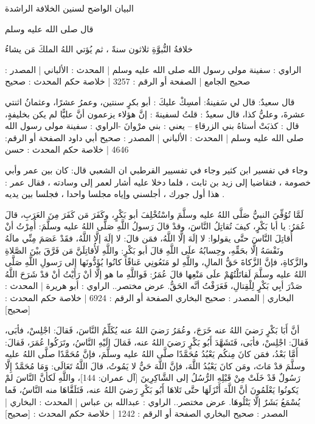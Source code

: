 البيان الواضح لسنين الخلافة الراشدة


قال صلى الله عليه وسلم 

خلافةُ النُّبوَّةِ ثلاثون سنةً ، ثم يُؤتي اللهُ الملكَ مَن يشاءُ

الراوي : سفينة مولى رسول الله صلى الله عليه وسلم | المحدث : الألباني | المصدر : صحيح الجامع | الصفحة أو الرقم : 3257 | خلاصة حكم المحدث : صحيح
   
قال سعيدٌ: قال لي سَفينةُ: أمسِكْ عليكَ : أبو بكرٍ سنتين، وعمرُ عشرًا، وعثمانُ اثنتي عشرةَ، وعليُّ كذا، قال سعيدٌ : قلتُ لسفينةَ : إنَّ هؤلاء يزعمون أنَّ عليًّا لم يكن بخليفةٍ، قال : كذبَتْ أستاهُ بني الزرقاءِ – يعني : بني مرْوانَ -الراوي : سفينة مولى رسول الله صلى الله عليه وسلم | المحدث : الألباني | المصدر : صحيح أبي داود
الصفحة أو الرقم: 4646 | خلاصة حكم المحدث : حسن

وجاء في تفسير ابن كثير 
وجاء في تفسيير القرطبي ان الشعبي قال: كان بين عمر وأبي خصومة ، فتقاضيا إلى زيد بن ثابت ، فلما دخلا عليه أشار لعمر إلى وسادته ، فقال عمر : هذا أول جورك ، أجلسني وإياه مجلسا واحدا ، فجلسا بين يديه .


لَمَّا تُوُفِّيَ النبيُّ صَلَّى اللهُ عليه وسلَّمَ واسْتُخْلِفَ أبو بَكْرٍ، وكَفَرَ مَن كَفَرَ مِنَ العَرَبِ، قالَ عُمَرُ: يا أبا بَكْرٍ، كيفَ تُقاتِلُ النَّاسَ، وقدْ قالَ رَسولُ اللَّهِ صَلَّى اللهُ عليه وسلَّمَ: أُمِرْتُ أنْ أُقاتِلَ النَّاسَ حتَّى يقولوا: لا إلَهَ إلَّا اللَّهُ، فمَن قالَ: لا إلَهَ إلَّا اللَّهُ، فقَدْ عَصَمَ مِنِّي مالَهُ ونَفْسَهُ إلَّا بحَقِّهِ، وحِسابُهُ علَى اللَّهِ قالَ أبو بَكْرٍ: واللَّهِ لَأُقاتِلَنَّ مَن فَرَّقَ بيْنَ الصَّلاةِ والزَّكاةِ، فإنَّ الزَّكاةَ حَقُّ المالِ، واللَّهِ لو مَنَعُونِي عَناقًا كانُوا يُؤَدُّونَها إلى رَسولِ اللَّهِ صَلَّى اللهُ عليه وسلَّمَ لَقاتَلْتُهُمْ علَى مَنْعِها قالَ عُمَرُ: فَواللَّهِ ما هو إلَّا أنْ رَأَيْتُ أنْ قدْ شَرَحَ اللَّهُ صَدْرَ أبِي بَكْرٍ لِلْقِتالِ، فَعَرَفْتُ أنَّه الحَقُّ.
عرض مختصر..
الراوي : أبو هريرة | المحدث : البخاري | المصدر : صحيح البخاري
الصفحة أو الرقم : 6924 | خلاصة حكم المحدث : [صحيح]

أنَّ أَبَا بَكْرٍ رَضيَ اللهُ عنه خَرَجَ، وعُمَرُ رَضيَ اللهُ عنه يُكَلِّمُ النَّاسَ، فَقالَ: اجْلِسْ، فأبَى، فَقالَ: اجْلِسْ، فأبَى، فَتَشَهَّدَ أَبُو بَكْرٍ رَضيَ اللهُ عنه، فَمَالَ إلَيْهِ النَّاسُ، وتَرَكُوا عُمَرَ، فَقالَ: أَمَّا بَعْدُ، فمَن كانَ مِنكُم يَعْبُدُ مُحَمَّدًا صلَّى اللهُ عليه وسلَّمَ، فإنَّ مُحَمَّدًا صلَّى اللهُ عليه وسلَّمَ قدْ مَاتَ، ومَن كانَ يَعْبُدُ اللَّهَ، فإنَّ اللَّهَ حَيٌّ لا يَمُوتُ، قالَ اللَّهُ تَعَالَى: {وَمَا مُحَمَّدٌ إِلَّا رَسُولٌ قَدْ خَلَتْ مِنْ قَبْلِهِ الرُّسُلُ} إلى {الشَّاكِرِينَ} [آل عمران: 144]، واللَّهِ لَكأنَّ النَّاسَ لمْ يَكونُوا يَعْلَمُونَ أنَّ اللَّهَ أَنْزَلَهَا حتَّى تَلاهَا أَبُو بَكْرٍ رَضيَ اللهُ عنه، فَتَلَقَّاهَا منه النَّاسُ، فَما يُسْمَعُ بَشَرٌ إلَّا يَتْلُوهَا.
عرض مختصر..
الراوي : عبدالله بن عباس | المحدث : البخاري | المصدر : صحيح البخاري
الصفحة أو الرقم : 1242 | خلاصة حكم المحدث : [صحيح] 

